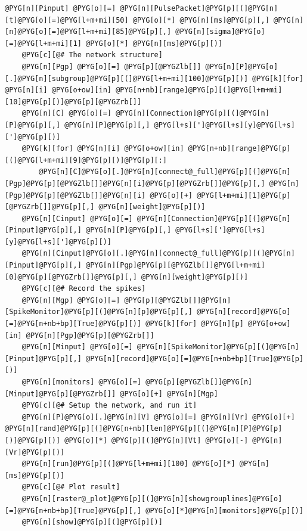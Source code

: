 \documentclass[letterpaper,10pt,english]{manual}
\begin{document}
\begin{Verbatim}[commandchars=@\[\]]
    @PYG[n][Pinput] @PYG[o][=] @PYG[n][PulsePacket]@PYG[p][(]@PYG[n][t]@PYG[o][=]@PYG[l+m+mi][50] @PYG[o][*] @PYG[n][ms]@PYG[p][,] @PYG[n][n]@PYG[o][=]@PYG[l+m+mi][85]@PYG[p][,] @PYG[n][sigma]@PYG[o][=]@PYG[l+m+mi][1] @PYG[o][*] @PYG[n][ms]@PYG[p][)]
    @PYG[c][@# The network structure]
    @PYG[n][Pgp] @PYG[o][=] @PYG[p][@PYGZlb[]] @PYG[n][P]@PYG[o][.]@PYG[n][subgroup]@PYG[p][(]@PYG[l+m+mi][100]@PYG[p][)] @PYG[k][for] @PYG[n][i] @PYG[o+ow][in] @PYG[n+nb][range]@PYG[p][(]@PYG[l+m+mi][10]@PYG[p][)]@PYG[p][@PYGZrb[]]
    @PYG[n][C] @PYG[o][=] @PYG[n][Connection]@PYG[p][(]@PYG[n][P]@PYG[p][,] @PYG[n][P]@PYG[p][,] @PYG[l+s][']@PYG[l+s][y]@PYG[l+s][']@PYG[p][)]
    @PYG[k][for] @PYG[n][i] @PYG[o+ow][in] @PYG[n+nb][range]@PYG[p][(]@PYG[l+m+mi][9]@PYG[p][)]@PYG[p][:]
        @PYG[n][C]@PYG[o][.]@PYG[n][connect@_full]@PYG[p][(]@PYG[n][Pgp]@PYG[p][@PYGZlb[]]@PYG[n][i]@PYG[p][@PYGZrb[]]@PYG[p][,] @PYG[n][Pgp]@PYG[p][@PYGZlb[]]@PYG[n][i] @PYG[o][+] @PYG[l+m+mi][1]@PYG[p][@PYGZrb[]]@PYG[p][,] @PYG[n][weight]@PYG[p][)]
    @PYG[n][Cinput] @PYG[o][=] @PYG[n][Connection]@PYG[p][(]@PYG[n][Pinput]@PYG[p][,] @PYG[n][P]@PYG[p][,] @PYG[l+s][']@PYG[l+s][y]@PYG[l+s][']@PYG[p][)]
    @PYG[n][Cinput]@PYG[o][.]@PYG[n][connect@_full]@PYG[p][(]@PYG[n][Pinput]@PYG[p][,] @PYG[n][Pgp]@PYG[p][@PYGZlb[]]@PYG[l+m+mi][0]@PYG[p][@PYGZrb[]]@PYG[p][,] @PYG[n][weight]@PYG[p][)]
    @PYG[c][@# Record the spikes]
    @PYG[n][Mgp] @PYG[o][=] @PYG[p][@PYGZlb[]]@PYG[n][SpikeMonitor]@PYG[p][(]@PYG[n][p]@PYG[p][,] @PYG[n][record]@PYG[o][=]@PYG[n+nb+bp][True]@PYG[p][)] @PYG[k][for] @PYG[n][p] @PYG[o+ow][in] @PYG[n][Pgp]@PYG[p][@PYGZrb[]]
    @PYG[n][Minput] @PYG[o][=] @PYG[n][SpikeMonitor]@PYG[p][(]@PYG[n][Pinput]@PYG[p][,] @PYG[n][record]@PYG[o][=]@PYG[n+nb+bp][True]@PYG[p][)]
    @PYG[n][monitors] @PYG[o][=] @PYG[p][@PYGZlb[]]@PYG[n][Minput]@PYG[p][@PYGZrb[]] @PYG[o][+] @PYG[n][Mgp]
    @PYG[c][@# Setup the network, and run it]
    @PYG[n][P]@PYG[o][.]@PYG[n][V] @PYG[o][=] @PYG[n][Vr] @PYG[o][+] @PYG[n][rand]@PYG[p][(]@PYG[n+nb][len]@PYG[p][(]@PYG[n][P]@PYG[p][)]@PYG[p][)] @PYG[o][*] @PYG[p][(]@PYG[n][Vt] @PYG[o][-] @PYG[n][Vr]@PYG[p][)]
    @PYG[n][run]@PYG[p][(]@PYG[l+m+mi][100] @PYG[o][*] @PYG[n][ms]@PYG[p][)]
    @PYG[c][@# Plot result]
    @PYG[n][raster@_plot]@PYG[p][(]@PYG[n][showgrouplines]@PYG[o][=]@PYG[n+nb+bp][True]@PYG[p][,] @PYG[o][*]@PYG[n][monitors]@PYG[p][)]
    @PYG[n][show]@PYG[p][(]@PYG[p][)]



\end{Verbatim}
\end{document}
